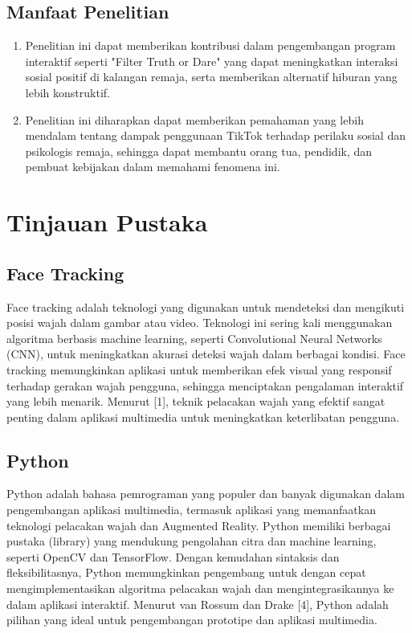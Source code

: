 \documentclass[11pt,a4paper]{article}
\begin{document}
\subsection{Manfaat Penelitian}
\begin{enumerate}
    \item Penelitian ini dapat memberikan kontribusi dalam pengembangan program interaktif seperti "Filter Truth or Dare" yang dapat meningkatkan interaksi sosial positif di kalangan remaja, serta memberikan alternatif hiburan yang lebih konstruktif.
    \item Penelitian ini diharapkan dapat memberikan pemahaman yang lebih mendalam tentang dampak penggunaan TikTok terhadap perilaku sosial dan psikologis remaja, sehingga dapat membantu orang tua, pendidik, dan pembuat kebijakan dalam memahami fenomena ini.
\end{enumerate}

\newpage
\section{Tinjauan Pustaka}
\subsection{Face Tracking}
Face tracking adalah teknologi yang digunakan untuk mendeteksi dan mengikuti posisi wajah dalam gambar atau video. Teknologi ini sering kali menggunakan algoritma berbasis machine learning, seperti Convolutional Neural Networks (CNN), untuk meningkatkan akurasi deteksi wajah dalam berbagai kondisi. Face tracking memungkinkan aplikasi untuk memberikan efek visual yang responsif terhadap gerakan wajah pengguna, sehingga menciptakan pengalaman interaktif yang lebih menarik. Menurut [1], teknik pelacakan wajah yang efektif sangat penting dalam aplikasi multimedia untuk meningkatkan keterlibatan pengguna.

\subsection{Python}
Python adalah bahasa pemrograman yang populer dan banyak digunakan dalam pengembangan aplikasi multimedia, termasuk aplikasi yang memanfaatkan teknologi pelacakan wajah dan Augmented Reality. Python memiliki berbagai pustaka (library) yang mendukung pengolahan citra dan machine learning, seperti OpenCV dan TensorFlow. Dengan kemudahan sintaksis dan fleksibilitasnya, Python memungkinkan pengembang untuk dengan cepat mengimplementasikan algoritma pelacakan wajah dan mengintegrasikannya ke dalam aplikasi interaktif. Menurut van Rossum dan Drake [4], Python adalah pilihan yang ideal untuk pengembangan prototipe dan aplikasi multimedia.
\end{document}
